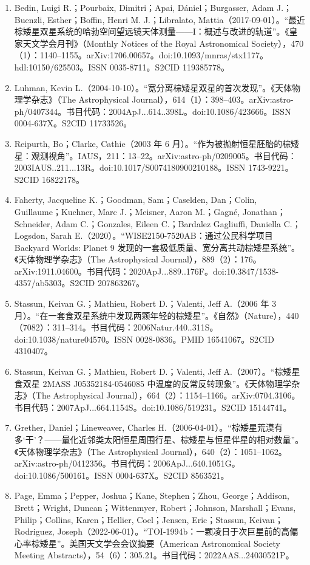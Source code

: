 \begin{enumerate}
\item Bedin, Luigi R.；Pourbaix, Dimitri；Apai, Dániel；Burgasser, Adam J.；Buenzli, Esther；Boffin, Henri M. J.；Libralato, Mattia（2017-09-01）。“最近棕矮星双星系统的哈勃空间望远镜天体测量——I：概述与改进的轨道”。《皇家天文学会月刊》（Monthly Notices of the Royal Astronomical Society），470（1）：1140–1155。arXiv:1706.00657。doi:10.1093/mnras/stx1177。hdl:10150/625503。ISSN 0035-8711。S2CID 119385778。
\item Luhman, Kevin L.（2004-10-10）。“宽分离棕矮星双星的首次发现”。《天体物理学杂志》（The Astrophysical Journal），614（1）：398–403。arXiv:astro-ph/0407344。书目代码：2004ApJ...614..398L。doi:10.1086/423666。ISSN 0004-637X。S2CID 11733526。
\item Reipurth, Bo；Clarke, Cathie（2003 年 6 月）。“作为被抛射恒星胚胎的棕矮星：观测视角”。IAUS，211：13–22。arXiv:astro-ph/0209005。书目代码：2003IAUS..211...13R。doi:10.1017/S0074180900210188。ISSN 1743-9221。S2CID 16822178。
\item Faherty, Jacqueline K.；Goodman, Sam；Caselden, Dan；Colin, Guillaume；Kuchner, Marc J.；Meisner, Aaron M.；Gagné, Jonathan；Schneider, Adam C.；Gonzales, Eileen C.；Bardalez Gagliuffi, Daniella C.；Logsdon, Sarah E.（2020）。“WISE2150-7520AB：通过公民科学项目 Backyard Worlds: Planet 9 发现的一套极低质量、宽分离共动棕矮星系统”。《天体物理学杂志》（The Astrophysical Journal），889（2）：176。arXiv:1911.04600。书目代码：2020ApJ...889..176F。doi:10.3847/1538-4357/ab5303。S2CID 207863267。
\item Stassun, Keivan G.；Mathieu, Robert D.；Valenti, Jeff A.（2006 年 3 月）。“在一套食双星系统中发现两颗年轻的棕矮星”。《自然》（Nature），440（7082）：311–314。书目代码：2006Natur.440..311S。doi:10.1038/nature04570。ISSN 0028-0836。PMID 16541067。S2CID 4310407。
\item Stassun, Keivan G.；Mathieu, Robert D.；Valenti, Jeff A.（2007）。“棕矮星食双星 2MASS J05352184-0546085 中温度的反常反转现象”。《天体物理学杂志》（The Astrophysical Journal），664（2）：1154–1166。arXiv:0704.3106。书目代码：2007ApJ...664.1154S。doi:10.1086/519231。S2CID 15144741。
\item Grether, Daniel；Lineweaver, Charles H.（2006-04-01）。“棕矮星荒漠有多‘干’？——量化近邻类太阳恒星周围行星、棕矮星与恒星伴星的相对数量”。《天体物理学杂志》（The Astrophysical Journal），640（2）：1051–1062。arXiv:astro-ph/0412356。书目代码：2006ApJ...640.1051G。doi:10.1086/500161。ISSN 0004-637X。S2CID 8563521。
\item Page, Emma；Pepper, Joshua；Kane, Stephen；Zhou, George；Addison, Brett；Wright, Duncan；Wittenmyer, Robert；Johnson, Marshall；Evans, Philip；Collins, Karen；Hellier, Coel；Jensen, Eric；Stassun, Keivan；Rodriguez, Joseph（2022-06-01）。“TOI-1994b：一颗凌日于次巨星前的高偏心率棕矮星”。美国天文学会会议摘要（American Astronomical Society Meeting Abstracts），54（6）：305.21。书目代码：2022AAS...24030521P。

\end{enumerate}
